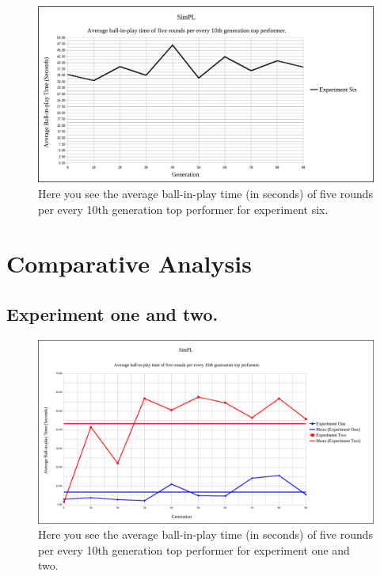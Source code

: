 \documentclass[a4paper,10pt]{article}
\begin{document}
\begin{figure}[H]  
  \centering
  \includegraphics[width=1\textwidth]{figures/exp6_10_tops_times.png}
  \caption{Here you see the average ball-in-play time (in seconds) of five rounds per every 10th generation top performer for experiment six.}
  \label{fig:exp6_10_tops_times}
\end{figure}

\section{Comparative Analysis}

\subsection{Experiment one and two.}

\begin{figure}[H]  
  \centering
  \includegraphics[width=1\textwidth]{figures/exp12_10_tops_times.png}
  \caption{Here you see the average ball-in-play time (in seconds) of five rounds per every 10th generation top performer for experiment one and two.}
  \label{fig:exp12_10_tops_times}
\end{figure}
\end{document}
